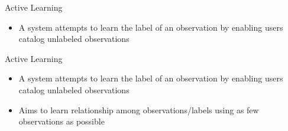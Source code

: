 \begin{frame}{Active Learning}
    \begin{itemize}
        \item A system attempts to learn the label of an observation by enabling users catalog unlabeled observations \cite{report:active-learning}
    \end{itemize}
\end{frame}

\begin{frame}{Active Learning}
    \begin{itemize}
        \item A system attempts to learn the label of an observation by enabling users catalog unlabeled observations \cite{report:active-learning}
        \item Aims to learn relationship among observations/labels using as few observations as possible
    \end{itemize}
\end{frame}


